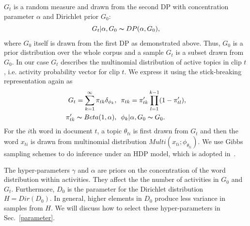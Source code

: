 $G_t$ is a random measure and drawn from the second DP with concentration parameter $\alpha$ and Dirichlet prior $G_0$:
\begin{equation*}
	G_t|\alpha,G_0 \thicksim DP(\alpha,G_0),
\end{equation*}
where $G_0$ itself is drawn from the first DP as demonstrated above. Thus, $G_0$ is a prior distribution over the whole corpus and a sample $G_t$ is a subset drawn from $G_0$. In our case $G_t$ describes the multinomial distribution of active topics in clip $t$, i.e. activity probability vector for clip $t$. We express it using the stick-breaking representation again as
\begin{align*}
	G_t = \sum^\infty_{k=1}\pi _{tk}\delta_{\phi_k},&~~\pi_{tk} =\pi _{tk}'\prod^{k-1}_{l=1}(1-\pi _{tl}'),\\
	\pi_{tk}'\thicksim Beta(1,\alpha),&~~\phi_k|\alpha,G_0 \thicksim G_0.
\end{align*}
For the $i$th word in document $t$, a topic $\theta_{ti}$ is first drawn from $G_t$ and then the word $x_{ti}$ is drawn from multinomial distribution $Multi(x_{ti};\phi_{\theta_{ti}})$. 
We use Gibbs sampling schemes to do inference under an HDP model, which is adopted in~\cite{teh2006hdp}. %

The hyper-parameters $\gamma$ and $\alpha$ are priors on the concentration of the word distribution within activities. They affect the the number of activities in $G_0$ and $G_t$. Furthermore, $D_0$ is the parameter for the Dirichlet distribution $H = Dir(D_0)$. In general, higher elements in $D_0$ produce less variance in samples from $H$. We will discuss how to select these hyper-parameters in Sec.~\ref{parameter}.

